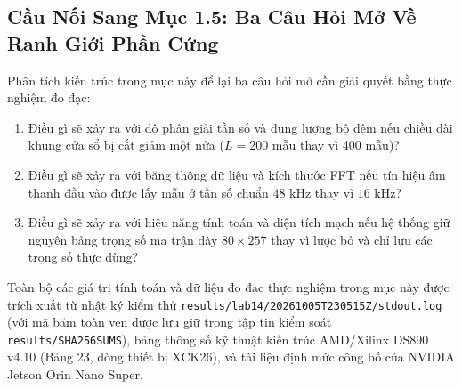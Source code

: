 \documentclass[11pt,a4paper]{article}
\begin{document}
\subsection*{Cầu Nối Sang Mục 1.5: Ba Câu Hỏi Mở Về Ranh Giới Phần Cứng}

Phân tích kiến trúc trong mục này để lại ba câu hỏi mở cần giải quyết bằng thực nghiệm đo đạc:
\begin{enumerate}
    \item Điều gì sẽ xảy ra với độ phân giải tần số và dung lượng bộ đệm nếu chiều dài khung cửa sổ bị cắt giảm một nửa ($L = 200$ mẫu thay vì 400 mẫu)?
    \item Điều gì sẽ xảy ra với băng thông dữ liệu và kích thước FFT nếu tín hiệu âm thanh đầu vào được lấy mẫu ở tần số chuẩn $48\text{ kHz}$ thay vì $16\text{ kHz}$?
    \item Điều gì sẽ xảy ra với hiệu năng tính toán và diện tích mạch nếu hệ thống giữ nguyên bảng trọng số ma trận dày $80 \times 257$ thay vì lược bỏ và chỉ lưu các trọng số thực dùng?
\end{enumerate}

Toàn bộ các giá trị tính toán và dữ liệu đo đạc thực nghiệm trong mục này được trích xuất từ nhật ký kiểm thử \texttt{results/lab14/20261005T230515Z/stdout.log} (với mã băm toàn vẹn được lưu giữ trong tập tin kiểm soát \texttt{results/SHA256SUMS}), bảng thông số kỹ thuật kiến trúc AMD/Xilinx DS890 v4.10 (Bảng 23, dòng thiết bị XCK26), và tài liệu định mức công bố của NVIDIA Jetson Orin Nano Super.
\end{document}
